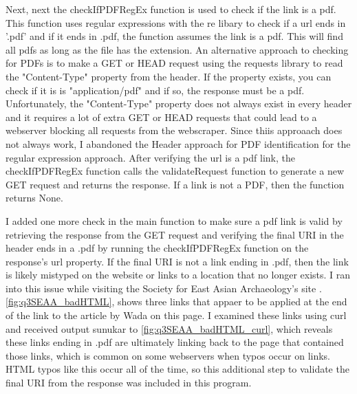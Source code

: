 \documentclass[12pt]{article}
\begin{document}
Next, next the checkIfPDFRegEx function is used to check if the link is a pdf. This function uses regular expressions with the re libary to check if a url ends in '.pdf' and if it ends in .pdf, the function assumes the link is a pdf. This will find all pdfs as long as the file has the extension. An alternative approach to checking for PDFs is to make a GET or HEAD request using the requests library to read the "Content-Type" property from the header.  If the property exists, you can check if it is is "application/pdf" and if so, the response must be a pdf. Unfortunately, the "Content-Type" property does not always exist in every header and it requires a lot of extra GET or HEAD requests that could lead to a webserver blocking all requests from the webscraper. Since thiis approaach does not always work, I abandoned the Header approach for PDF identification for the regular expression approach. After verifying the url is a pdf link, the checkIfPDFRegEx function calls the validateRequest function to generate a new GET request and returns the response. If a link is not a PDF, then the function returns None. 

I added one more check in the main function to make sure a pdf link is valid by retrieving the response from the GET request and verifying the final URI in the header ends in a .pdf by running the checkIfPDFRegEx function on the response's url property. If the final URI is not a link ending in .pdf, then the link is likely mistyped on the website or links to a location that no longer exists. I ran into this issue while visiting the Society for East Asian Archaeology's site \cite{bulletin2016SEAA}.  \ref{fig:q3SEAA_badHTML}, shows three links that appaer to be applied at the end of the link to the article by Wada on this page. I examined these links using curl and received output sunukar to \ref{fig:q3SEAA_badHTML_curl}, which reveals these links ending in .pdf are ultimately linking back to the page that contained those links, which is common on some webservers when typos occur on links. HTML typos like this occur all of the time, so this additional step to validate the final URI from the response was included in this program.
\end{document}
